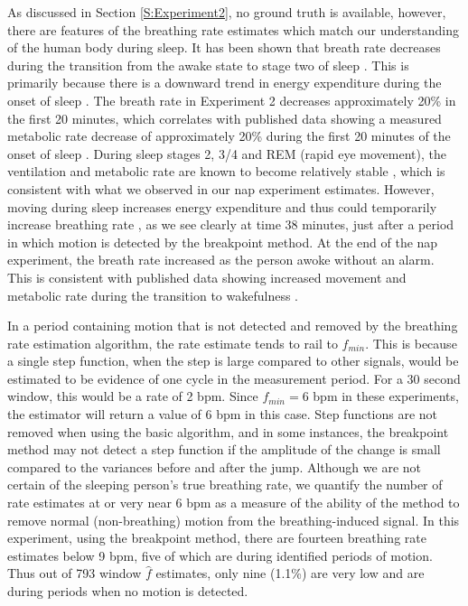 \documentclass[10pt,journal,letterpaper]{IEEEtran}
\begin{document}
As discussed in Section \ref{S:Experiment2}, no ground truth is available, however, there are features of the breathing rate estimates which match our understanding of the human body during sleep.  It has been shown that breath rate decreases during the transition from the awake state to stage two of sleep \cite{white1985metabolic}. This is primarily because there is a downward trend in energy expenditure during the onset of sleep \cite{white1985metabolic,katayose2009metabolic}.  The breath rate in Experiment 2 decreases approximately 20\% in the first 20 minutes, which correlates with published data showing a measured metabolic rate decrease of approximately 20\% during the first 20 minutes of the onset of sleep \cite{katayose2009metabolic}. During sleep stages 2, 3/4 and REM (rapid eye movement), the ventilation and metabolic rate are known to become relatively stable \cite{white1985metabolic,douglas1982respiration}, which is consistent with what we observed in our nap experiment estimates. However, moving 
during sleep increases energy expenditure and thus could temporarily increase breathing rate \cite{white1985metabolic}, as we see clearly at time 38 minutes, just after a period in which motion is detected by the breakpoint method. At the end of the nap experiment, the breath rate increased as the person awoke without an alarm. This is consistent with published data showing increased movement and metabolic rate during the transition to wakefulness \cite{katayose2009metabolic}.

In a period containing motion that is not detected and removed by the breathing rate estimation algorithm, the rate estimate tends to rail to $f_{min}$.  This is because a single step function, when the step is large compared to other signals, would be estimated to be evidence of one cycle in the measurement period.  For a 30 second window, this would be a rate of 2 bpm.  Since $f_{min} = 6$ bpm in these experiments, the estimator will return a value of 6 bpm in this case.  Step functions are not removed when using the basic algorithm, and in some instances, the breakpoint method may not detect a step function if the amplitude of the change is small compared to the variances before and after the jump.  Although we are not certain of the sleeping person's true breathing rate, we quantify the number of rate estimates at or very near 6 bpm as a measure of the ability of the method to remove normal (non-breathing) motion from the breathing-induced signal.  In this experiment, using the breakpoint method, there 
are fourteen breathing rate estimates below 9 bpm, five of which are during identified periods of motion.  Thus out of 793 window $\hat{f}$ estimates, only nine (1.1\%) are very low and are during periods when no motion is detected.  
\end{document}
